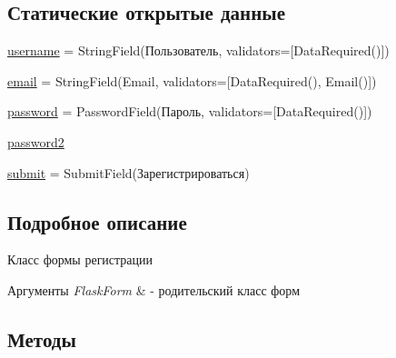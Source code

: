\subsection*{Статические открытые данные}
\begin{DoxyCompactItemize}
\item 
\mbox{\hyperlink{classapp_1_1forms_1_1_registration_form_ac4f31c06a04cfadf0ecf269bcb65c29b}{username}} = String\+Field(\textquotesingle{}Пользователь\textquotesingle{}, validators=\mbox{[}Data\+Required()\mbox{]})
\item 
\mbox{\hyperlink{classapp_1_1forms_1_1_registration_form_af98d363c036c4b9afcf8ac4bc2d3ee6a}{email}} = String\+Field(\textquotesingle{}Email\textquotesingle{}, validators=\mbox{[}Data\+Required(), Email()\mbox{]})
\item 
\mbox{\hyperlink{classapp_1_1forms_1_1_registration_form_a20158cd008a957749d4315a3acbdc114}{password}} = Password\+Field(\textquotesingle{}Пароль\textquotesingle{}, validators=\mbox{[}Data\+Required()\mbox{]})
\item 
\mbox{\hyperlink{classapp_1_1forms_1_1_registration_form_a29d1668141132f75f709ae0d02ae4a2c}{password2}}
\item 
\mbox{\hyperlink{classapp_1_1forms_1_1_registration_form_a64e8b7e4c4567cdd41fb495c8473748a}{submit}} = Submit\+Field(\textquotesingle{}Зарегистрироваться\textquotesingle{})
\end{DoxyCompactItemize}


\subsection{Подробное описание}
Класс формы регистрации 


\begin{DoxyParams}{Аргументы}
{\em Flask\+Form} & -\/ родительский класс форм \\
\hline
\end{DoxyParams}


\subsection{Методы}
\mbox{\label{classapp_1_1forms_1_1_registration_form_a03ad81c1e7ea6eaad93fb503be3f6f4b}} 
